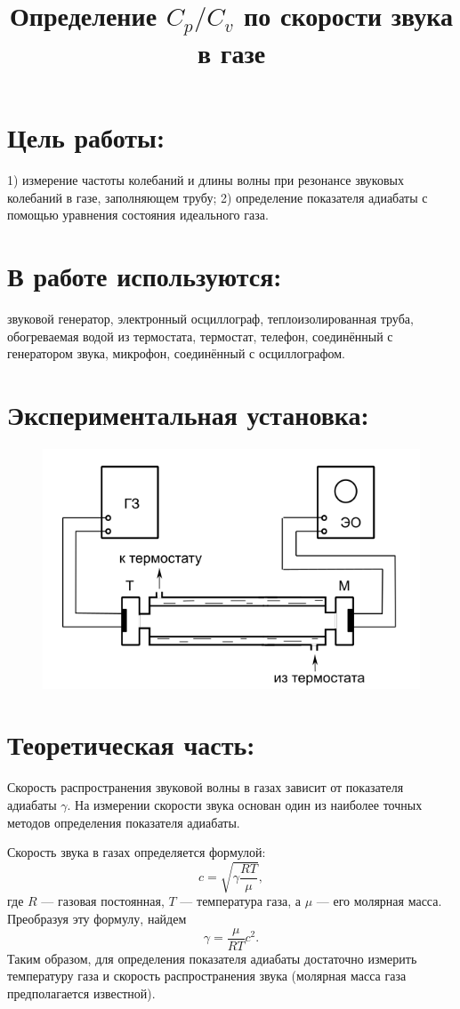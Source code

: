 \documentclass[20pt]{article}
\author{}
\title{Определение $C_p/C_v$ по скорости звука в газе}
\date{}
\begin{document}
\parindent=1cm
\large
\maketitle
\section{Цель работы:}
1) измерение частоты колебаний и длины волны при резонансе звуковых колебаний в газе, заполняющем трубу;
2) определение показателя адиабаты с помощью уравнения состояния идеального газа.
\section{В работе используются:}
звуковой генератор, электронный осциллограф, теплоизолированная труба, обогреваемая водой из термостата, термостат, телефон, соединённый с генератором звука, микрофон, соединённый с осциллографом.
\section{Экспериментальная установка:}
\begin{figure}[H]
\center
\includegraphics[scale=0.5]{asd.png}
\end{figure}
\section{Теоретическая часть:}	

Скорость распространения звуковой волны в газах зависит от показателя адиабаты $\gamma$. На измерении скорости звука основан один из наиболее точных методов определения показателя адиабаты.

Скорость звука в газах определяется формулой:
\[
	c = \sqrt{\gamma \frac{RT}{\mu}},
\]
где $R$ --- газовая постоянная, $T$ --- температура газа, а $\mu$ --- его молярная масса. Преобразуя эту формулу, найдем
\begin{equation}
	\gamma = \frac{\mu}{RT} c^2.
\end{equation}
Таким образом, для определения показателя адиабаты достаточно измерить температуру газа и скорость распространения звука (молярная масса газа предполагается известной).
\end{document}

